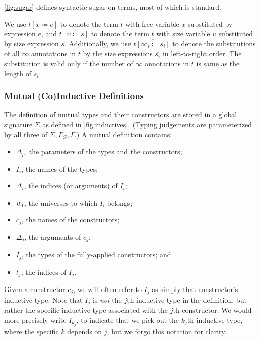 \autoref{fig:sugar} defines syntactic sugar on terms, most of which is standard.

We use $t[x \coloneqq e]$ to denote the term $t$ with free variable $x$ substituted by expression $e$, and $t[\upsilon \coloneqq s]$ to denote the term $t$ with size variable $\upsilon$ substituted by size expression $s$.
Additionally, we use $t\overline{[\infty_i \coloneqq s_i]}$ to denote the substitutions of all $\infty$ annotations in $t$ by the size expressions $\overline{s_i}$ in left-to-right order.
The substitution is valid only if the number of $\infty$ annotations in $t$ is same as the length of $\overline{s_i}$.

\subsubsection{Mutual (Co)Inductive Definitions}



The definition of mutual \coinductive types and their constructors are stored in a global signature $\Sigma$ as defined in \autoref{fig:inductives}.
(Typing judgements are parameterized by all three of $\Sigma, \Gamma_G, \Gamma$.)
A mutual \coinductive definition contains:

\begin{itemize}
    \item $\Delta_p$, the parameters of the \coinductive types and the constructors;
    \item $I_i$, the names of the \coinductive types;
    \item $\Delta_i$, the indices (or arguments) of $I_i$;
    \item $w_i$, the universes to which $I_i$ belongs;
    \item $c_j$, the names of the constructors;
    \item $\Delta_j$, the arguments of $c_j$;
    \item $I_j$, the \coinductive types of the fully-applied constructors; and
    \item $\overline{t}_j$, the indices of $I_j$.
\end{itemize}

Given a constructor $c_j$, we will often refer to $I_j$ as simply that constructor's inductive type.
Note that $I_j$ is \textit{not} the $j$th inductive type in the definition, but rather the specific inductive type associated with the $j$th constructor.
We would more precisely write $I_{k_j}$, to indicate that we pick out the $k_j$th inductive type, where the specific $k$ depends on $j$, but we forgo this notation for clarity.

